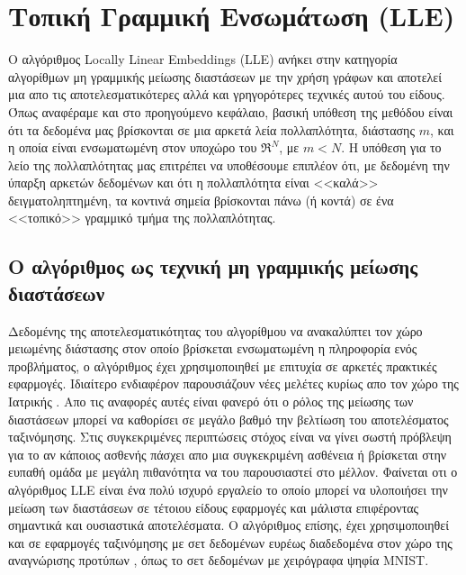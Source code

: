 
\chapter{Τοπική Γραμμική Ενσωμάτωση (\textlatin{LLE})}
\par
Ο αλγόριθμος \textlatin{Locally Linear Embeddings (LLE)}\cite{lle} ανήκει στην κατηγορία αλγορίθμων μη γραμμικής μείωσης διαστάσεων με την χρήση γράφων και αποτελεί μια απο τις αποτελεσματικότερες αλλά και γρηγορότερες τεχνικές αυτού του είδους. Όπως αναφέραμε και στο προηγούμενο κεφάλαιο, βασική υπόθεση της μεθόδου είναι ότι τα δεδομένα μας βρίσκονται σε μια αρκετά λεία πολλαπλότητα, διάστασης $m$, και η οποία είναι ενσωματωμένη στον υποχώρο του $ \Re^{N} $, με $m<N$. Η υπόθεση για το λείο της πολλαπλότητας μας επιτρέπει να υποθέσουμε επιπλέον ότι, με δεδομένη την ύπαρξη αρκετών δεδομένων και ότι η πολλαπλότητα είναι <<καλά>> δειγματοληπτημένη, τα κοντινά σημεία βρίσκονται πάνω (ή κοντά) σε ένα <<τοπικό>> γραμμικό τμήμα της πολλαπλότητας.

\section{Ο αλγόριθμος ως τεχνική μη γραμμικής μείωσης διαστάσεων}
\par
Δεδομένης της αποτελεσματικότητας του αλγορίθμου να ανακαλύπτει τον χώρο μειωμένης διάστασης στον οποίο βρίσκεται ενσωματωμένη η πληροφορία ενός προβλήματος, ο αλγόριθμος έχει χρησιμοποιηθεί με επιτυχία σε αρκετές πρακτικές εφαρμογές. Ιδιαίτερο ενδιαφέρον παρουσιάζουν νέες μελέτες κυρίως απο τον χώρο της Ιατρικής \cite{1} \cite{2}. Απο τις αναφορές αυτές είναι φανερό ότι ο ρόλος της μείωσης των διαστάσεων μπορεί να καθορίσει σε μεγάλο βαθμό την βελτίωση του αποτελέσματος ταξινόμησης. Στις συγκεκριμένες περιπτώσεις στόχος είναι να γίνει σωστή πρόβλεψη για το αν κάποιος ασθενής πάσχει απο μια συγκεκριμένη ασθένεια ή βρίσκεται στην ευπαθή ομάδα με μεγάλη πιθανότητα να του παρουσιαστεί στο μέλλον. Φαίνεται οτι ο αλγόριθμος \textlatin{LLE}\textlatin{\cite{lle}} είναι ένα πολύ ισχυρό εργαλείο το οποίο μπορεί να υλοποιήσει την μείωση των διαστάσεων σε τέτοιου είδους εφαρμογές και μάλιστα επιφέροντας σημαντικά και ουσιαστικά αποτελέσματα. Ο αλγόριθμος επίσης, έχει χρησιμοποιηθεί και σε εφαρμογές ταξινόμησης με σετ δεδομένων ευρέως διαδεδομένα στον χώρο της αναγνώρισης προτύπων \cite{3} \cite{4} \cite{5}, όπως το σετ δεδομένων με χειρόγραφα ψηφία \textlatin{MNIST}\textlatin{\cite{mnist}}.

